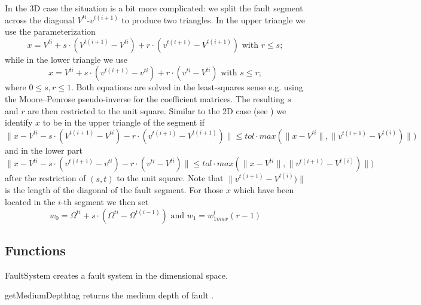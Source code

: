 In the 3D case the situation is a bit more complicated: we split the fault
segment across the diagonal $V^{ti}$-$v^{t(i+1)}$ to produce two triangles.
In the upper triangle we use the parameterization 
\begin{equation}
x= V^{ti} + s \cdot (V^{t(i+1)}-V^{ti})  + r \cdot (v^{t(i+1)}-V^{t(i+1)})
\mbox{ with } r \le s; 
\label{eq:2D line 4}
\end{equation}
while in the lower triangle we use
\begin{equation}
x= V^{ti} +  s \cdot (v^{t(i+1)}-v^{ti}) + r \cdot (v^{ti}-V^{ti})
\mbox{ with } s \le r; 
\label{eq:2D line 4b}
\end{equation}
where $0\le s,r \le 1$. Both equations are solved in the least-squares sense
e.g. using the Moore–Penrose pseudo-inverse for the coefficient matrices.
The resulting $s$ and $r$ are then restricted to the unit square. Similar to
the 2D case (see ) we identify $x$ to be in the upper
triangle of the segment if
\begin{equation}
\|x- V^{ti} - s \cdot (V^{t(i+1)}-V^{ti})  - r \cdot (v^{t(i+1)}-V^{t(i+1)}) \|
\le tol \cdot  max(\|x-V^{ti} \|,\|v^{t(i+1)}-V^{t(i)})\|) 
\label{eq:2D line 4c}
\end{equation}
and in the lower part
\begin{equation}
\|x-V^{ti} -  s \cdot (v^{t(i+1)}-v^{ti}) - r \cdot (v^{ti}-V^{ti}) \|
\le tol \cdot  max(\|x-V^{ti} \|,\|v^{t(i+1)}-V^{t(i)})\|)  
\label{eq:2D line 4d}
\end{equation}
after the restriction of $(s,t)$ to the unit square.
Note that $\|v^{t(i+1)}-V^{t(i)})\|$ is the length of the diagonal of the
fault segment. For those $x$ which have been located in the $i$-th segment we
then set
\begin{equation}
w_{0}=\Omega^{ti}+s \cdot (\Omega^{ti}-\Omega^{t(i-1)})
\mbox{ and }
w_{1}=w^t_{1max} (r-1) 
\label{eq:2D line 5}
\end{equation}

\subsection{Functions}

\begin{classdesc}{FaultSystem}{}
creates a fault system in the  dimensional space.
\end{classdesc}

\begin{methoddesc}[FaultSystem]{getMediumDepth}{tag}
returns the medium depth of fault .
\end{methoddesc}

